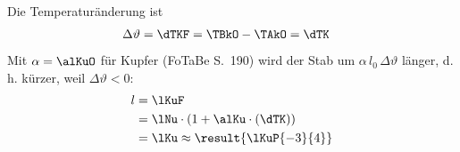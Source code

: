 Die Temperaturänderung ist
\begin{align}
 \Delta\vartheta &= \dTKF = \TBkO-\TAkO = \dTK
\end{align}
Mit $\alpha = \alKuO$ für Kupfer (FoTaBe S.~190) wird der Stab um $\alpha\,l_0\,\Delta\vartheta$ länger, d.\,h. kürzer, weil $\Delta\vartheta<0$:
\begin{align}
 l &= \lKuF \\
   &= \lNu\cdot\left(1+\alKu\cdot\left(\dTK\right)\right) \\
   &= \lKu \approx \result{\lKuP{-3}{4}}
\end{align}
